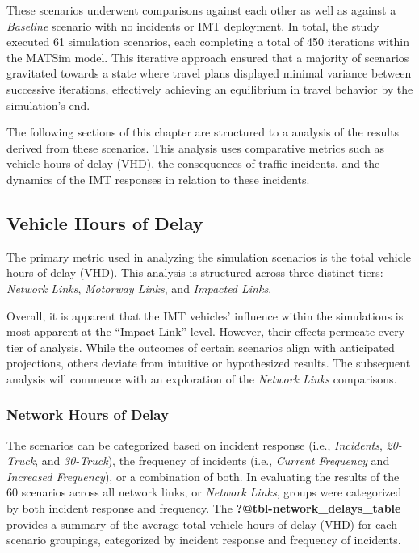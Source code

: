 \documentclass[
  letterpaper,
  authoryear]{elsarticle}
\begin{document}
These scenarios underwent comparisons against each other as well as
against a \emph{Baseline} scenario with no incidents or IMT deployment.
In total, the study executed 61 simulation scenarios, each completing a
total of 450 iterations within the MATSim model. This iterative approach
ensured that a majority of scenarios gravitated towards a state where
travel plans displayed minimal variance between successive iterations,
effectively achieving an equilibrium in travel behavior by the
simulation's end.

The following sections of this chapter are structured to a analysis of
the results derived from these scenarios. This analysis uses comparative
metrics such as vehicle hours of delay (VHD), the consequences of
traffic incidents, and the dynamics of the IMT responses in relation to
these incidents.

\hypertarget{vehicle-hours-of-delay}{%
\subsection{Vehicle Hours of Delay}\label{vehicle-hours-of-delay}}

The primary metric used in analyzing the simulation scenarios is the
total vehicle hours of delay (VHD). This analysis is structured across
three distinct tiers: \emph{Network Links}, \emph{Motorway Links}, and
\emph{Impacted Links}.

Overall, it is apparent that the IMT vehicles' influence within the
simulations is most apparent at the ``Impact Link'' level. However,
their effects permeate every tier of analysis. While the outcomes of
certain scenarios align with anticipated projections, others deviate
from intuitive or hypothesized results. The subsequent analysis will
commence with an exploration of the \emph{Network Links} comparisons.

\hypertarget{network-hours-of-delay}{%
\subsubsection{Network Hours of Delay}\label{network-hours-of-delay}}

The scenarios can be categorized based on incident response (i.e.,
\emph{Incidents}, \emph{20-Truck}, and \emph{30-Truck}), the frequency
of incidents (i.e., \emph{Current Frequency} and \emph{Increased
Frequency}), or a combination of both. In evaluating the results of the
60 scenarios across all network links, or \emph{Network Links}, groups
were categorized by both incident response and frequency. The
\textbf{?@tbl-network\_delays\_table} provides a summary of the average
total vehicle hours of delay (VHD) for each scenario groupings,
categorized by incident response and frequency of incidents.
\end{document}
